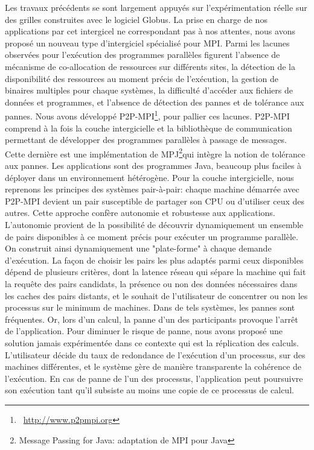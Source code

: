 \documentclass[11pt]{article}
\newcommand{\pmpi}{\mbox{\textsc{P2P-MPI}}}
\begin{document}
Les travaux précédents se sont largement appuyés sur l'expérimentation réelle
sur des grilles construites avec le logiciel Globus. La prise en charge de nos 
applications par cet intergicel ne correspondant pas à nos attentes, nous avons 
proposé un nouveau type d'intergiciel spécialisé pour MPI. Parmi les 
lacunes observées pour l'exécution des programmes parallèles figurent l'absence 
de mécanisme de co-allocation de ressources sur différents sites, la détection 
de la disponibilité des ressources au moment précis de l'exécution, la gestion 
de binaires multiples pour chaque systèmes, la difficulté d'accéder aux fichiers
de données et programmes, et l'absence de détection des pannes et de tolérance 
aux pannes. Nous avons développé {\pmpi}\footnote{~\url{http://www.p2pmpi.org}},
pour pallier ces lacunes. {\pmpi} comprend à la fois la couche intergicielle et 
la bibliothèque de communication permettant de développer des programmes 
parallèles à passage de messages. Cette dernière est une implémentation de 
MPJ\footnote{Message Passing for Java: adaptation de MPI pour Java}qui intègre 
la notion de tolérance aux pannes. Les applications sont des programmes Java, 
beaucoup plus faciles à déployer dans un environnement hétérogène.
Pour la couche intergicielle, nous reprenons les principes des systèmes 
pair-à-pair: chaque machine démarrée avec {\pmpi} devient un pair susceptible 
de partager son CPU ou d'utiliser ceux des autres. Cette approche confère 
autonomie et robustesse aux applications. L'autonomie provient de la 
possibilité de découvrir dynamiquement un ensemble de pairs disponibles à ce 
moment précis pour exécuter un programme parallèle. On construit ainsi 
dynamiquement une "plate-forme" à chaque demande d'exécution. La façon de 
choisir les pairs les plus adaptés parmi ceux disponibles dépend de plusieurs 
critères, dont la latence réseau qui sépare la machine qui fait la requête des 
pairs candidats, la présence ou non des données nécessaires dans les caches des 
pairs distants, et le souhait de l'utilisateur de concentrer ou non les 
processus sur le minimum de machines. Dans de tels systèmes, les pannes sont 
fréquentes. Or, lors d'un calcul, la panne d'un des participants provoque 
l'arrêt de l'application. Pour diminuer le risque de panne, nous avons proposé 
une solution jamais expérimentée dans ce contexte qui est la réplication des 
calculs. L'utilisateur décide du taux de redondance de l'exécution d'un 
processus, sur des machines différentes, et le système gère de manière 
transparente la cohérence de l'exécution. En cas de panne de l'un des processus, 
l'application peut poursuivre son exécution tant qu'il subsiste au moins une 
copie de ce processus de calcul.\\
\end{document}
